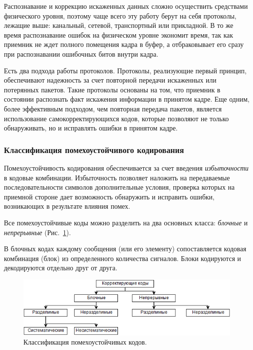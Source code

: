\documentclass[12pt,a4paper]{article}
\begin{document}
  Распознавание и коррекцию искаженных данных сложно осущест\-вить средствами физического уровня, поэтому чаще всего эту работу берут на себя протоколы, лежащие выше: канальный, сетевой, транспортный или прикладной. В то же время распознавание ошибок на физическом уровне экономит время, так как приемник не ждет полного помещения кадра в буфер, а отбраковывает его сразу при распознавании ошибочных битов внутри кадра.
  
  Есть два подхода работы протоколов. Протоколы, реализующие первый принцип, обеспечивают надежность за счет повторной передачи искаженных или потерянных пакетов. Такие протоколы основаны на том, что приемник в состоянии распознать факт искажения информации в принятом кадре. Еще одним, более эффективным подходом, чем повторная передача пакетов, является использование самокорректирующихся кодов, которые позволяют не только обнаруживать, но и исправлять ошибки в принятом кадре.
  
\subsubsection{Классификация помехоустойчивого кодирования}
  
  Помехоустойчивость кодирования обеспечивается за счет введения \emph{избыточности} в кодовые комбинации. Избыточность позволяет наложить на передаваемые последовательности символов дополнительные условия, проверка которых на приемной стороне дает возможность обнаружить и исправить ошибки, возникающих в результате влияния помех.
  
  Все помехоустойчивые коды можно разделить на два основных класса: \emph{блочные} и \textit{непрерывные} (Рис.~\ref{img:t:class}).

  В блочных кодах каждому сообщения (или его элементу) сопоставляется кодовая комбинация (блок) из определенного количества сигналов. Блоки кодируются и декодируются отдельно друг от друга.
  
  \begin{figure}[!ht]
	  \centering
	  \includegraphics[width=\linewidth]{class}
	  \caption{Классификация помехоустойчивых кодов.}
	  \label{img:t:class}
  \end{figure}
  
\end{document}
